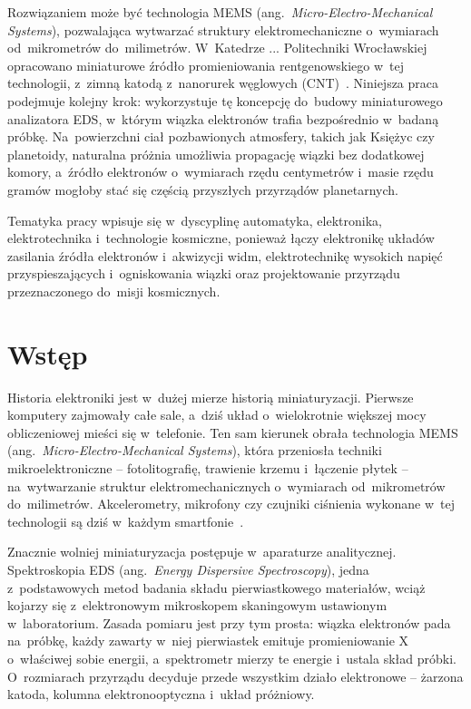 Rozwiązaniem może być technologia MEMS
(ang.~\textit{Micro-Electro-Mechanical Systems}), pozwalająca wytwarzać
struktury elektromechaniczne o~wymiarach od~mikrometrów do~milimetrów.
W~Katedrze ... Politechniki Wrocławskiej opracowano miniaturowe źródło
promieniowania rentgenowskiego w~tej technologii, z~zimną katodą
z~nanorurek węglowych (CNT)~\cite{TODO-urbanski}. Niniejsza praca
podejmuje kolejny krok: wykorzystuje tę koncepcję do~budowy
miniaturowego analizatora EDS, w~którym wiązka elektronów trafia
bezpośrednio w~badaną próbkę. Na~powierzchni ciał pozbawionych
atmosfery, takich jak Księżyc czy planetoidy, naturalna próżnia
umożliwia propagację wiązki bez dodatkowej komory, a~źródło elektronów
o~wymiarach rzędu centymetrów i~masie rzędu gramów mogłoby stać się
częścią przyszłych przyrządów planetarnych.

Tematyka pracy wpisuje się w~dyscyplinę automatyka, elektronika,
elektrotechnika i~technologie kosmiczne, ponieważ łączy elektronikę
układów zasilania źródła elektronów i~akwizycji widm, elektrotechnikę
wysokich napięć przyspieszających i~ogniskowania wiązki oraz
projektowanie przyrządu przeznaczonego do~misji kosmicznych.


\chapter{Wstęp}

Historia elektroniki jest w~dużej mierze historią miniaturyzacji.
Pierwsze komputery zajmowały całe sale, a~dziś układ o~wielokrotnie
większej mocy obliczeniowej mieści się w~telefonie. Ten sam kierunek
obrała technologia MEMS (ang.~\textit{Micro-Electro-Mechanical Systems}),
która przeniosła techniki mikroelektroniczne -- fotolitografię, trawienie
krzemu i~łączenie płytek -- na~wytwarzanie struktur
elektromechanicznych o~wymiarach od~mikrometrów do~milimetrów.
Akcelerometry, mikrofony czy czujniki ciśnienia wykonane w~tej
technologii są dziś w~każdym smartfonie~\cite{TODO-mems}.

Znacznie wolniej miniaturyzacja postępuje w~aparaturze analitycznej.
Spektroskopia EDS (ang.~\textit{Energy Dispersive Spectroscopy}),
jedna z~podstawowych metod badania składu pierwiastkowego materiałów,
wciąż kojarzy się z~elektronowym mikroskopem skaningowym ustawionym
w~laboratorium. Zasada pomiaru jest przy tym prosta: wiązka elektronów
pada na~próbkę, każdy zawarty w~niej pierwiastek emituje promieniowanie X
o~właściwej sobie energii, a~spektrometr mierzy te energie i~ustala
skład próbki. O~rozmiarach przyrządu decyduje przede wszystkim
działo elektronowe -- żarzona katoda, kolumna elektronooptyczna
i~układ próżniowy.

